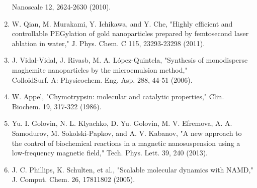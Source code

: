 \documentclass[12pt, a4paper]{article}
\begin{document}
\begin{enumerate}
  Nanoscale 12, 2624-2630 (2010).
  \item W. Qian, M. Murakami, Y. Ichikawa, and Y. Che, "Highly efficient and controllable PEGylation of gold nanoparticles prepared by femtosecond laser ablation in water," J. Phys. Chem. C 115, 23293-23298 (2011).
  \item J. Vidal-Vidal, J. Rivasb, M. A. López-Quintela, "Synthesis of monodisperse maghemite nanoparticles by the microemulsion method," \\
  ColloidSurf. A: Physicochem. Eng. Asp. 288, 44-51 (2006).
  \item W. Appel, "Chymotrypsin: molecular and catalytic properties," Clin. Biochem. 19, 317-322 (1986).
  \item Yu. I. Golovin, N. L. Klyachko, D. Yu. Golovin, M. V. Efremova, A. A. Samodurov, M. Sokolski-Papkov, and A. V. Kabanov, "A new approach to the control of biochemical reactions in a magnetic nanosuspension using a low-frequency magnetic field," Tech. Phys. Lett. 39, 240 (2013).
  \item J. C. Phillips, K. Schulten, et al., "Scalable molecular dynamics with NAMD," J. Comput. Chem. 26, 17811802 (2005).
\end{enumerate}
\end{document}
